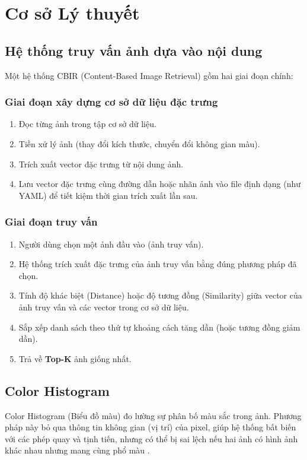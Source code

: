 \chapter{Cơ sở Lý thuyết}

\section{Hệ thống truy vấn ảnh dựa vào nội dung}
Một hệ thống CBIR (Content-Based Image Retrieval) gồm hai giai đoạn chính:

\subsection{Giai đoạn xây dựng cơ sở dữ liệu đặc trưng}
\begin{enumerate}
    \item Đọc từng ảnh trong tập cơ sở dữ liệu.
    \item Tiền xử lý ảnh (thay đổi kích thước, chuyển đổi không gian màu).
    \item Trích xuất vector đặc trưng từ nội dung ảnh.
    \item Lưu vector đặc trưng cùng đường dẫn hoặc nhãn ảnh vào file định dạng (như YAML) để tiết kiệm thời gian trích xuất lần sau.
\end{enumerate}

\subsection{Giai đoạn truy vấn}
\begin{enumerate}
    \item Người dùng chọn một ảnh đầu vào (ảnh truy vấn).
    \item Hệ thống trích xuất đặc trưng của ảnh truy vấn bằng đúng phương pháp đã chọn.
    \item Tính độ khác biệt (Distance) hoặc độ tương đồng (Similarity) giữa vector của ảnh truy vấn và các vector trong cơ sở dữ liệu.
    \item Sắp xếp danh sách theo thứ tự khoảng cách tăng dần (hoặc tương đồng giảm dần).
    \item Trả về \textbf{Top-K} ảnh giống nhất.
\end{enumerate}


\section{Color Histogram}
Color Histogram (Biểu đồ màu) đo lường sự phân bố màu sắc trong ảnh. Phương pháp này bỏ qua thông tin không gian (vị trí) của pixel, giúp hệ thống bất biến với các phép quay và tịnh tiến, nhưng có thể bị sai lệch nếu hai ảnh có hình ảnh khác nhau nhưng mang cùng phổ màu \cite{datta2008image}.

